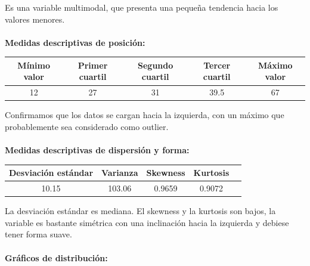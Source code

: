 \documentclass[11pt]{article}
\begin{document}
Es una variable multimodal, que presenta una pequeña tendencia hacia los valores menores.
\\
\\
\textbf{Medidas descriptivas de posición:}

\begin{center}
\begin{tabular}{|c|c|c|c|c|}
    \hline
    Mínimo valor & Primer cuartil & Segundo cuartil & Tercer cuartil & Máximo valor\\ \hline
    12 & 27 & 31 & 39.5 & 67\\
    \hline
\end{tabular}
\end{center}

Confirmamos que los datos se cargan hacia la izquierda, con un máximo que probablemente sea considerado como outlier.
\\
\\
\textbf{Medidas descriptivas de dispersión y forma:}

\begin{center}
\begin{tabular}{|c|c|c|c|c|}
    \hline
    Desviación estándar  & Varianza & Skewness & Kurtosis\\ \hline
    10.15 & 103.06 & 0.9659 & 0.9072\\
    \hline
\end{tabular}
\end{center}

La desviación estándar es mediana. El skewness y la kurtosis son bajos, la variable es bastante simétrica con una inclinación hacia la izquierda y debiese tener forma suave.
\\
\\
\textbf{Gráficos de distribución:}
\\
\end{document}
